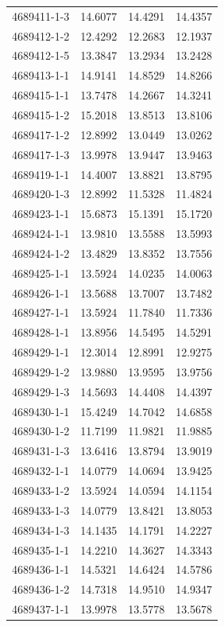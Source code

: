 \begin{longtable}{lrrr}
4689411-1-3 & 14.6077 & 14.4291 & 14.4357 \\
4689412-1-2 & 12.4292 & 12.2683 & 12.1937 \\
4689412-1-5 & 13.3847 & 13.2934 & 13.2428 \\
4689413-1-1 & 14.9141 & 14.8529 & 14.8266 \\
4689415-1-1 & 13.7478 & 14.2667 & 14.3241 \\
4689415-1-2 & 15.2018 & 13.8513 & 13.8106 \\
4689417-1-2 & 12.8992 & 13.0449 & 13.0262 \\
4689417-1-3 & 13.9978 & 13.9447 & 13.9463 \\
4689419-1-1 & 14.4007 & 13.8821 & 13.8795 \\
4689420-1-3 & 12.8992 & 11.5328 & 11.4824 \\
4689423-1-1 & 15.6873 & 15.1391 & 15.1720 \\
4689424-1-1 & 13.9810 & 13.5588 & 13.5993 \\
4689424-1-2 & 13.4829 & 13.8352 & 13.7556 \\
4689425-1-1 & 13.5924 & 14.0235 & 14.0063 \\
4689426-1-1 & 13.5688 & 13.7007 & 13.7482 \\
4689427-1-1 & 13.5924 & 11.7840 & 11.7336 \\
4689428-1-1 & 13.8956 & 14.5495 & 14.5291 \\
4689429-1-1 & 12.3014 & 12.8991 & 12.9275 \\
4689429-1-2 & 13.9880 & 13.9595 & 13.9756 \\
4689429-1-3 & 14.5693 & 14.4408 & 14.4397 \\
4689430-1-1 & 15.4249 & 14.7042 & 14.6858 \\
4689430-1-2 & 11.7199 & 11.9821 & 11.9885 \\
4689431-1-3 & 13.6416 & 13.8794 & 13.9019 \\
4689432-1-1 & 14.0779 & 14.0694 & 13.9425 \\
4689433-1-2 & 13.5924 & 14.0594 & 14.1154 \\
4689433-1-3 & 14.0779 & 13.8421 & 13.8053 \\
4689434-1-3 & 14.1435 & 14.1791 & 14.2227 \\
4689435-1-1 & 14.2210 & 14.3627 & 14.3343 \\
4689436-1-1 & 14.5321 & 14.6424 & 14.5786 \\
4689436-1-2 & 14.7318 & 14.9510 & 14.9347 \\
4689437-1-1 & 13.9978 & 13.5778 & 13.5678 \\

\end{longtable}
